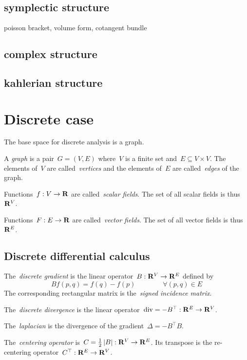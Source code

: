 \subsection{symplectic structure}

poisson bracket, volume form, cotangent bundle

\subsection{complex structure}

\subsection{kahlerian structure}


\clearpage
\section{Discrete case}

The base space for discrete analysis is a graph.

A \emph{graph} is a pair~$G=(V,E)$ where~$V$ is a finite set
and~$E\subseteq V\times V$.  The elements of~$V$ are called~\emph{vertices}
and the elements of~$E$ are called~\emph{edges} of the graph.


Functions~$f:V\to\mathbf{R}$ are called~\emph{scalar fields}.
The set of all scalar fields is thus~$\mathbf{R}^V$.

Functions~$F:E\to\mathbf{R}$ are called~\emph{vector fields}.
The set of all vector fields is thus~$\mathbf{R}^E$.

\subsection{Discrete differential calculus}

The~\emph{discrete gradient} is the linear operator~$B:\mathbf{R}^V\to\mathbf{R}^E$ defined
by
\[
	Bf(p,q)=f(q)-f(p)
	\qquad\qquad\forall (p,q)\in E
\]
The corresponding rectangular matrix is the~\emph{signed incidence matrix}.

The~\emph{discrete divergence} is the linear
operator~$\mathrm{div}=-B^\top:\mathbf{R}^E\to\mathbf{R}^V$.

The~\emph{laplacian} is the divergence of the gradient~$\Delta=-B^\top B$.

The~\emph{centering operator} is~$C=\frac12\left|B\right|:\mathbf{R}^V\to\mathbf{R}^E$.  Its
transpose is the re-centering operator~$C^\top:\mathbf{R}^E\to\mathbf{R}^V$.

